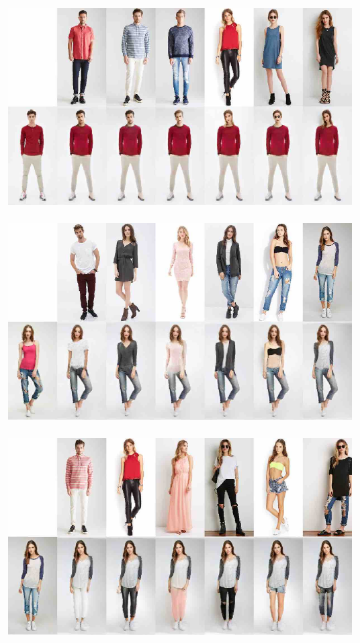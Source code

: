 	\begin{figure}[htp]
		\begin{subfigure}{0.49\linewidth}
		\centering
		\includegraphics[trim={0cm 0cm 0cm 0cm},clip, width=1.\linewidth]{fig/factor/part6_01}\caption{}
		\label{fig:part3_00}
		\end{subfigure}
		\begin{subfigure}{0.49\linewidth}
		\centering
		\includegraphics[trim={0cm 0cm 0cm 0cm},clip, width=1.\linewidth]{fig/factor/part6_10}\caption{}
		\label{fig:part3_11}
		\end{subfigure}
		\begin{subfigure}{0.49\linewidth}
		\centering
		\includegraphics[trim={0cm 0cm 0cm 0cm},clip, width=1.\linewidth]{fig/factor/part6_21}\caption{}

\end{subfigure}
\end{figure}
